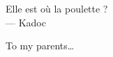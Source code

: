 

\cleardoublepage
\thispagestyle{empty}


\vspace*{3cm}

\begin{raggedleft}
    	Elle est où la poulette ?\\
     --- Kadoc\\
\end{raggedleft}

\vspace{4cm}

\begin{center}
    To my parents\dots
\end{center}